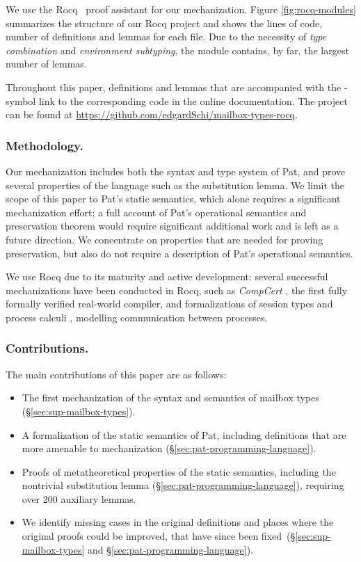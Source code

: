 We use the Rocq~\cite{teamRocqProver2025} proof assistant for our mechanization.
Figure \ref{fig:rocq-modules} summarizes the structure of our Rocq project and
shows the lines of code, number of definitions and lemmas for each file. 
Due to the necessity of \emph{type combination} and \emph{environment
subtyping}, the  module contains, by far, the largest number
of lemmas.

Throughout this paper, definitions and lemmas that are accompanied
with the \rocqlogo -symbol link to the corresponding code in the online
documentation.
The project can be found at \url{https://github.com/edgardSchi/mailbox-types-rocq}.

\subsubsection{Methodology.}
Our mechanization includes both the syntax and type system of Pat, and prove
several properties of the language such as the substitution lemma.
%
We limit the scope of this paper to Pat's static semantics, which alone requires
a significant mechanization effort; a full account of Pat's operational
semantics and preservation theorem would require significant additional work and
is left as a future direction.  We concentrate on properties that are needed for
proving preservation, but also do not require a description of Pat's operational
semantics.

We use Rocq due to its maturity and active development: several successful
mechanizations have been conducted in Rocq, such as \emph{CompCert}
\cite{leroyFormalVerificationRealistic2009}, the first fully formally verified
real-world compiler, and formalizations of session types
\cite{tiroreMultipartyAsynchronousSession2025} and process calculi
\cite{ambalHOPiCoq2021}, modelling communication between processes.

\subsubsection{Contributions.}

The main contributions of this paper are as follows:

\begin{itemize}[leftmargin=*, labelsep=0.5em]
  \item The first mechanization of the syntax and semantics of mailbox types (\S\ref{sec:sup-mailbox-types}).
  \item A formalization of the static semantics of Pat, including definitions that are more
    amenable to mechanization (\S\ref{sec:pat-programming-language}).
  \item Proofs of metatheoretical properties of the static semantics, including
      the nontrivial substitution lemma (\S\ref{sec:pat-programming-language}), requiring over 200 auxiliary lemmas.
  \item We identify missing cases in the original definitions and places where
      the original proofs could be improved, that have since been
      fixed~(\S\ref{sec:sup-mailbox-types} and \S\ref{sec:pat-programming-language}).
\end{itemize}
